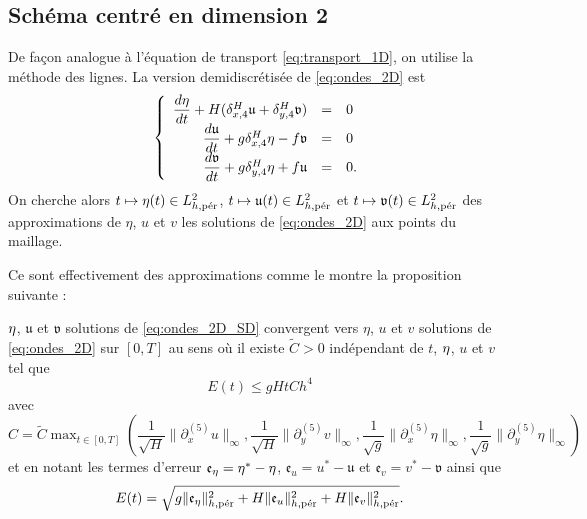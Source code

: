 \subsection{Schéma centré en dimension 2}

De façon analogue à l'équation de transport \eqref{eq:transport_1D}, on utilise la méthode des lignes. La version demidiscrétisée de \eqref{eq:ondes_2D} est
\begin{equation}
\left\lbrace
\begin{array}{rcl}
\dfrac{d \etafrak}{dt} + H ( \delta_{x,4}^H \mathfrak{u} + \delta_{y,4}^H \mathfrak{v} ) & = & 0 \\
\dfrac{d \mathfrak{u}}{dt} + g \delta_{x,4}^H \etafrak - f \mathfrak{v} & = & 0 \\
\dfrac{d \mathfrak{v}}{dt} + g \delta_{y,4}^H \etafrak + f \mathfrak{u} & = & 0. \\
\end{array}
\right.
\label{eq:ondes_2D_SD}
\end{equation}
On cherche alors $t \mapsto \etafrak(t) \in L^2_{h,\per}$, $t \mapsto \mathfrak{u}(t) \in L^2_{h,\per}$ et $t \mapsto \mathfrak{v}(t) \in L^2_{h,\per}$ des approximations de $\eta$, $u$ et $v$ les solutions de \eqref{eq:ondes_2D} aux points du maillage.

Ce sont effectivement des approximations comme le montre la proposition suivante :

\begin{proposition}
$\etafrak$, $\mathfrak{u}$ et $\mathfrak{v}$ solutions de \eqref{eq:ondes_2D_SD} convergent vers $\eta$, $u$ et $v$ solutions de \eqref{eq:ondes_2D} sur $[0,T]$ au sens où il existe $\tilde{C}>0$ indépendant de $t$, $\etafrak$, $u$ et $v$ tel que
\begin{equation}
E(t) \leq g H t C h^4
\end{equation}
avec $C = \tilde{C} \max_{t \in [0,T]} \left( \dfrac{1}{\sqrt{H}} \| \partial_x^{(5)} u \|_{\infty}, \dfrac{1}{\sqrt{H}} \| \partial_y^{(5)} v \|_{\infty}, \dfrac{1}{\sqrt{g}} \| \partial_x^{(5)} \eta \|_{\infty}, \dfrac{1}{\sqrt{g}} \| \partial_y^{(5)} \eta \|_{\infty}  \right)$
et en notant les termes d'erreur $\mathfrak{e}_{\eta} = \eta^* - \etafrak$, $\mathfrak{e}_{u} = u^* - \mathfrak{u}$ et $\mathfrak{e}_{v} = v^* - \mathfrak{v}$ ainsi que 
\begin{equation}
E(t) = \sqrt{ g \| \mathfrak{e}_{\eta} \|^2_{h,\per} + H \| \mathfrak{e}_u \|^2_{h,\per} + H \| \mathfrak{e}_v \|^2_{h,\per}}.
\end{equation}
\end{proposition}

